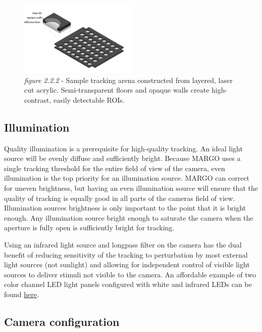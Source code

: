 \documentclass[11pt]{article}
\begin{document}
\begin{figure}[h!]
	\begin{center}
		\includegraphics[width=0.5\textwidth]{images/Hardware Setup/Behavioral Arenas/circular_arenas.pdf}
		\caption*{\footnotesize {\textit{figure 2.2.2} - Sample tracking arena constructed from layered, laser cut acrylic. Semi-transparent floors and opaque walls create high-contrast, easily detectable ROIs.}}
	\end{center}
\end{figure}

\hypertarget{illumsection}{\subsection{Illumination}}

Quality illumination is a prerequisite for high-quality tracking. An ideal light source will be evenly diffuse and sufficiently bright. Because MARGO uses a single tracking threshold for the entire field of view of the camera, even illumination is the top priority for an illumination source. MARGO can correct for uneven brightness, but having an even illumination source will ensure that the quality of tracking is equally good in all parts of the cameras field of view. Illumination sources brightness is only important to the point that it is bright enough. Any illumination source bright enough to saturate the camera when the aperture is fully open is sufficiently bright for tracking.

Using an infrared light source and longpass filter on the camera has the dual benefit of reducing sensitivity of the tracking to perturbation by most external light sources (not sunlight) and allowing for independent control of visible light sources to deliver stimuli not visible to the camera. An affordable example of two color channel LED light panels configured with white and infrared LEDs can be found \href{https://www.knema.com/led-modules.html}{here}.

\hypertarget{camconfig}{\subsection{Camera configuration}}
\end{document}
